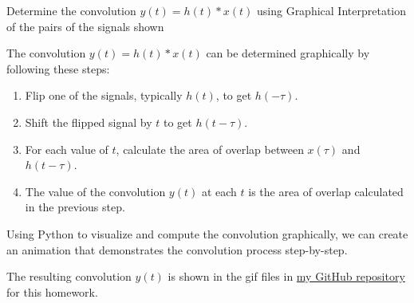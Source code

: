 \documentclass[a4paper, 10pt]{article}
\begin{document}
\newpage

\begin{problem}
Determine the convolution \( y(t) = h(t)*x(t) \) using Graphical Interpretation of the pairs of the signals shown
\end{problem}

\begin{solution}
The convolution \( y(t) = h(t) * x(t) \) can be determined graphically by following these steps:
\begin{enumerate}
    \item Flip one of the signals, typically \( h(t) \), to get \( h(-\tau) \).
    \item Shift the flipped signal by \( t \) to get \( h(t - \tau) \).
    \item For each value of \( t \), calculate the area of overlap between \( x(\tau) \) and \( h(t - \tau) \).
    \item The value of the convolution \( y(t) \) at each \( t \) is the area of overlap calculated in the previous step.
\end{enumerate}
Using Python to visualize and compute the convolution graphically, we can create an animation that demonstrates the convolution process step-by-step.

\vspace{3mm}

The resulting convolution \( y(t) \) is shown in the gif files in \href{https://github.com/patthadon-p/CEDT-2110203-CEM-II/tree/main/signal/homework-2/images}{my GitHub repository} for this homework.
\end{solution}
\end{document}
